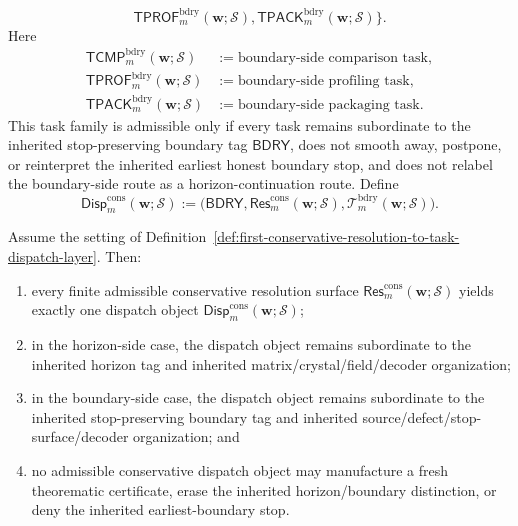 \begin{definition}
\begin{enumerate}[label=(\roman*)]
\[ \mathsf{TPROF}^{\mathrm{bdry}}_{m}(\mathbf w;\mathcal S),
 \mathsf{TPACK}^{\mathrm{bdry}}_{m}(\mathbf w;\mathcal S)
 \Bigr\}.
 \]
 Here
 \begin{align*}
 \mathsf{TCMP}^{\mathrm{bdry}}_{m}(\mathbf w;\mathcal S) &:= \text{boundary-side comparison task},\\
 \mathsf{TPROF}^{\mathrm{bdry}}_{m}(\mathbf w;\mathcal S) &:= \text{boundary-side profiling task},\\
 \mathsf{TPACK}^{\mathrm{bdry}}_{m}(\mathbf w;\mathcal S) &:= \text{boundary-side packaging task}.
 \end{align*}
 This task family is admissible only if every task remains subordinate to the inherited stop-preserving boundary tag \(\mathsf{BDRY}\), does not smooth away, postpone, or reinterpret the inherited earliest honest boundary stop, and does not relabel the boundary-side route as a horizon-continuation route. Define
 \[
 \mathsf{Disp}^{\mathrm{cons}}_{m}(\mathbf w;\mathcal S)
 :=
 \bigl(\mathsf{BDRY},\mathsf{Res}^{\mathrm{cons}}_{m}(\mathbf w;\mathcal S),\mathcal T^{\mathrm{bdry}}_{m}(\mathbf w;\mathcal S)\bigr).
 \]
\end{enumerate}
\end{definition}

\begin{proposition}
\label{prop:every-finite-admissible-conservative-resolution-surface-yields-exactly-one-route-faithful-conservative-dispatch-object}
Assume the setting of Definition~\ref{def:first-conservative-resolution-to-task-dispatch-layer}. Then:
\begin{enumerate}[label=(\roman*)]
 \item every finite admissible conservative resolution surface \(\mathsf{Res}^{\mathrm{cons}}_{m}(\mathbf w;\mathcal S)\) yields exactly one dispatch object \(\mathsf{Disp}^{\mathrm{cons}}_{m}(\mathbf w;\mathcal S)\);
 \item in the horizon-side case, the dispatch object remains subordinate to the inherited horizon tag and inherited matrix/crystal/field/decoder organization;
 \item in the boundary-side case, the dispatch object remains subordinate to the inherited stop-preserving boundary tag and inherited source/defect/stop-surface/decoder organization; and
 \item no admissible conservative dispatch object may manufacture a fresh theorematic certificate, erase the inherited horizon/boundary distinction, or deny the inherited earliest-boundary stop.
\end{enumerate}
\end{proposition}

